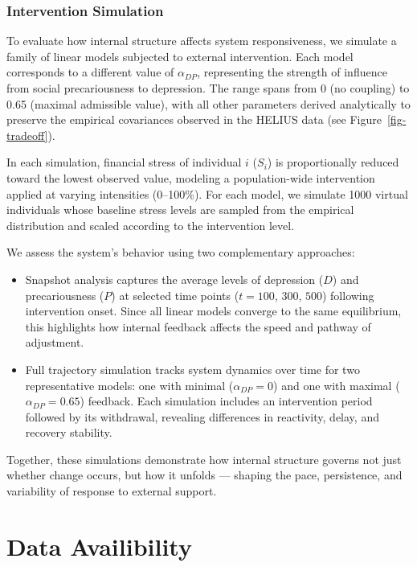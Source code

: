 \documentclass[
]{article}
\begin{document}
\subsubsection{Intervention Simulation}\label{intervention-simulation}

To evaluate how internal structure affects system responsiveness, we
simulate a family of linear models subjected to external intervention.
Each model corresponds to a different value of \(\alpha_{DP}\),
representing the strength of influence from social precariousness to
depression. The range spans from 0 (no coupling) to 0.65 (maximal
admissible value), with all other parameters derived analytically to
preserve the empirical covariances observed in the HELIUS data (see
Figure~\ref{fig-tradeoff}).

In each simulation, financial stress of individual \(i\) (\(S_i\)) is
proportionally reduced toward the lowest observed value, modeling a
population-wide intervention applied at varying intensities (0--100\%).
For each model, we simulate 1000 virtual individuals whose baseline
stress levels are sampled from the empirical distribution and scaled
according to the intervention level.

We assess the system's behavior using two complementary approaches:

\begin{itemize}
\item
  Snapshot analysis captures the average levels of depression (\(D\))
  and precariousness (\(P\)) at selected time points (\(t = 100\),
  \(300\), \(500\)) following intervention onset. Since all linear
  models converge to the same equilibrium, this highlights how internal
  feedback affects the speed and pathway of adjustment.
\item
  Full trajectory simulation tracks system dynamics over time for two
  representative models: one with minimal (\(\alpha_{DP} = 0\)) and one
  with maximal (\(\alpha_{DP} = 0.65\)) feedback. Each simulation
  includes an intervention period followed by its withdrawal, revealing
  differences in reactivity, delay, and recovery stability.
\end{itemize}

Together, these simulations demonstrate how internal structure governs
not just whether change occurs, but how it unfolds --- shaping the pace,
persistence, and variability of response to external support.

\section{Data Availibility}\label{data-availibility}
\end{document}
